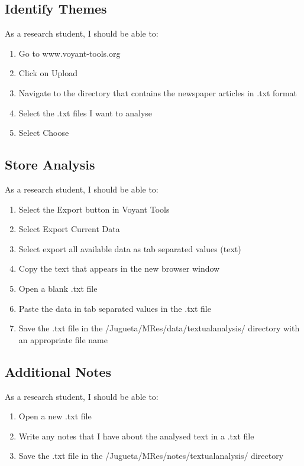 \documentclass{article}
\begin{document}
\subsection*{Identify Themes}

As a research student, I should be able to:
\begin{enumerate}
    \item Go to www.voyant-tools.org
    \item Click on Upload
    \item Navigate to the directory that contains the newspaper articles in .txt format
    \item Select the .txt files I want to analyse
    \item Select Choose
\end{enumerate}

\subsection*{Store Analysis}

As a research student, I should be able to:
\begin{enumerate}
    \item Select the Export button in Voyant Tools
    \item Select Export Current Data
    \item Select export all available data as tab separated values (text)
    \item Copy the text that appears in the new browser window
    \item Open a blank .txt file
    \item Paste the data in tab separated values in the .txt file
    \item Save the .txt file in the /Jugueta/MRes/data/textualanalysis/ directory with an appropriate file name
\end{enumerate}

\subsection*{Additional Notes}

As a research student, I should be able to:
\begin{enumerate}
    \item Open a new .txt file
    \item Write any notes that I have about the analysed text in a .txt file
    \item Save the .txt file in the /Jugueta/MRes/notes/textualanalysis/ directory
\end{enumerate}
\end{document}
